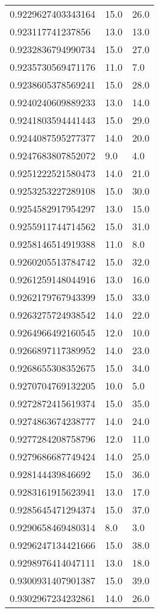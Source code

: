 \begin{center}
\begin{supertabular}[H]{p{0.30\textwidth}p{0.05\textwidth}p{0.05\textwidth}}
0.9229627403343164 & 15.0 & 26.0 \\ 
0.923117741237856 & 13.0 & 13.0 \\ 
0.9232836794990734 & 15.0 & 27.0 \\ 
0.9235730569471176 & 11.0 & 7.0 \\ 
0.9238605378569241 & 15.0 & 28.0 \\ 
0.9240240609889233 & 13.0 & 14.0 \\ 
0.9241803594441443 & 15.0 & 29.0 \\ 
0.9244087595277377 & 14.0 & 20.0 \\ 
0.9247683807852072 & 9.0 & 4.0 \\ 
0.9251222521580473 & 14.0 & 21.0 \\ 
0.9253253227289108 & 15.0 & 30.0 \\ 
0.9254582917954297 & 13.0 & 15.0 \\ 
0.9255911744714562 & 15.0 & 31.0 \\ 
0.9258146514919388 & 11.0 & 8.0 \\ 
0.9260205513784742 & 15.0 & 32.0 \\ 
0.9261259148044916 & 13.0 & 16.0 \\ 
0.9262179767943399 & 15.0 & 33.0 \\ 
0.9263275724938542 & 14.0 & 22.0 \\ 
0.9264966492160545 & 12.0 & 10.0 \\ 
0.9266897117389952 & 14.0 & 23.0 \\ 
0.9268655308352675 & 15.0 & 34.0 \\ 
0.9270704769132205 & 10.0 & 5.0 \\ 
0.9272872415619374 & 15.0 & 35.0 \\ 
0.9274863674238777 & 14.0 & 24.0 \\ 
0.9277284208758796 & 12.0 & 11.0 \\ 
0.9279686687749424 & 14.0 & 25.0 \\ 
0.928144439846692 & 15.0 & 36.0 \\ 
0.9283161915623941 & 13.0 & 17.0 \\ 
0.9285645471294374 & 15.0 & 37.0 \\ 
0.9290658469480314 & 8.0 & 3.0 \\ 
0.9296247134421666 & 15.0 & 38.0 \\ 
0.9298976414047111 & 13.0 & 18.0 \\ 
0.9300931407901387 & 15.0 & 39.0 \\ 
0.9302967234232861 & 14.0 & 26.0 \\ 

\end{supertabular}
\end{center}
